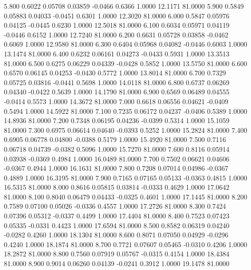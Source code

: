    5.800   0.6022   0.05708   0.03859  -0.0466   0.6366   1.0000  12.1171  81.0000
   5.900   0.5849   0.05883   0.04033  -0.0451   0.6301   1.0000  12.3020  81.0000
   6.000   0.5847   0.05976   0.04125  -0.0445   0.6230   1.0000  12.5018  81.0000
   6.100   0.6034   0.05971   0.04119  -0.0446   0.6152   1.0000  12.7240  81.0000
   6.200   0.6631   0.05728   0.03858  -0.0462   0.6069   1.0000  12.9580  81.0000
   6.300   0.6404   0.05968   0.04082  -0.0446   0.6003   1.0000  13.1474  81.0000
   6.400   0.6232   0.06161   0.04273  -0.0433   0.5931   1.0000  13.3513  81.0000
   6.500   0.6275   0.06229   0.04339  -0.0428   0.5852   1.0000  13.5750  81.0000
   6.600   0.6570   0.06145   0.04253  -0.0430   0.5772   1.0000  13.8014  81.0000
   6.700   0.7329   0.05725   0.03816  -0.0441   0.5698   1.0000  14.0118  81.0000
   6.800   0.6737   0.06269   0.04340  -0.0422   0.5639   1.0000  14.1790  81.0000
   6.900   0.6569   0.06489   0.04555  -0.0414   0.5573   1.0000  14.3672  81.0000
   7.000   0.6618   0.06556   0.04621  -0.0409   0.5494   1.0000  14.5922  81.0000
   7.100   0.7235   0.06172   0.04237  -0.0406   0.5389   1.0000  14.8936  81.0000
   7.200   0.7348   0.06195   0.04236  -0.0399   0.5314   1.0000  15.1059  81.0000
   7.300   0.6975   0.06614   0.04640  -0.0393   0.5252   1.0000  15.2824  81.0000
   7.400   0.6905   0.06778   0.04800  -0.0388   0.5179   1.0000  15.4920  81.0000
   7.500   0.7116   0.06718   0.04739  -0.0382   0.5096   1.0000  15.7270  81.0000
   7.600   0.8116   0.05914   0.03938  -0.0369   0.4984   1.0000  16.0489  81.0000
   7.700   0.7502   0.06621   0.04606  -0.0367   0.4944   1.0000  16.1631  81.0000
   7.800   0.7208   0.07014   0.04986  -0.0367   0.4889   1.0000  16.3195  81.0000
   7.900   0.7165   0.07165   0.05133  -0.0363   0.4815   1.0000  16.5315  81.0000
   8.000   0.8616   0.05815   0.03814  -0.0333   0.4629   1.0000  17.0642  81.0000
   8.100   0.8040   0.06479   0.04433  -0.0325   0.4601   1.0000  17.1445  81.0000
   8.200   0.7589   0.07100   0.05026  -0.0336   0.4557   1.0000  17.2726  81.0000
   8.300   0.7424   0.07396   0.05312  -0.0337   0.4499   1.0000  17.4404  81.0000
   8.400   0.7523   0.07423   0.05335  -0.0331   0.4423   1.0000  17.6594  81.0000
   8.500   0.8582   0.06319   0.04240  -0.0282   0.4260   1.0000  18.1304  81.0000
   8.600   0.8071   0.07050   0.04929  -0.0296   0.4240   1.0000  18.1874  81.0000
   8.700   0.7721   0.07607   0.05465  -0.0310   0.4206   1.0000  18.2872  81.0000
   8.800   0.7560   0.07919   0.05767  -0.0315   0.4154   1.0000  18.4384  81.0000
   8.900   0.9014   0.06260   0.04139  -0.0241   0.3912   1.0000  19.1478  81.0000
